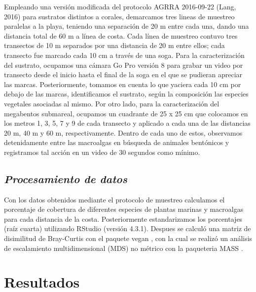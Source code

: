 \documentclass[
  authoryear,
  preprint,
  3p,
  twocolumn]{elsarticle}
\begin{document}
Empleando una versión modificada del protocolo AGRRA 2016-09-22 (Lang,
2016) para sustratos distintos a corales, demarcamos tres lineas de
muestreo paralelas a la playa, teniendo una separación de 20 m entre
cada una, dando una distancia total de 60 m a línea de costa. Cada línea
de muestreo contuvo tres transectos de 10 m separados por una distancia
de 20 m entre ellos; cada transecto fue marcado cada 10 cm a través de
una soga. Para la caracterización del sustrato, ocupamos una cámara Go
Pro versión 8 para grabar un video por transecto desde el inicio hasta
el final de la soga en el que se pudieran apreciar las marcas.
Posteriormente, tomamos en cuenta lo que yaciera cada 10 cm por debajo
de las marcas, identificamos el sustrato, según la composición las
especies vegetales asociadas al mismo. Por otro lado, para la
caracterización del megabentos submareal, ocupamos un cuadrante de 25 x
25 cm que colocamos en los metros 1, 3, 5, 7 y 9 de cada transecto y
aplicado a cada una de las distancias 20 m, 40 m y 60 m,
respectivamente. Dentro de cada uno de estos, observamos detenidamente
entre las macroalgas en búsqueda de animales bentónicos y registramos
tal acción en un video de 30 segundos como mínimo.

\hypertarget{procesamiento-de-datos}{%
\subsection{\texorpdfstring{\emph{Procesamiento de
datos}}{Procesamiento de datos}}\label{procesamiento-de-datos}}

Con los datos obtenidos mediante el protocolo de muestreo calculamos el
porcentaje de cobertura de diferentes especies de plantas marinas y
macroalgas para cada distancia de la costa. Posteriormente
estandarizamos los porcentajes (raíz cuarta) utilizando RStudio (versión
4.3.1). Despues se calculó una matriz de disimilitud de Bray-Curtis con
el paquete vegan \citep{manualR}, con la cual se realizó un análisis de
escalamiento multidimensional (MDS) no métrico con la paqueteria MASS
\citep{BookR}.

\hypertarget{resultados}{%
\section{Resultados}\label{resultados}}
\end{document}
